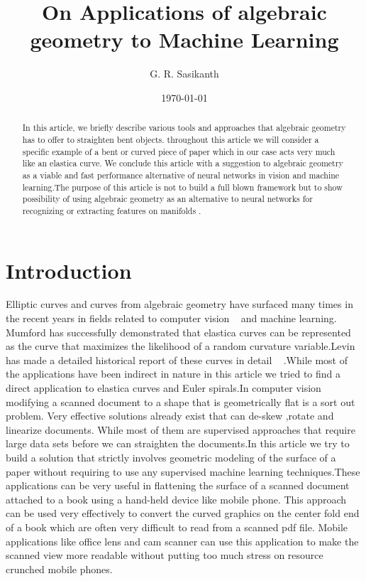 \documentclass[longbibliography]{revtex4-1}
\begin{document}
\title{On Applications of algebraic geometry to Machine Learning}
\author{G. R. Sasikanth}
\date{\today}
\begin{abstract}
 In this article, we briefly describe various tools and approaches that algebraic geometry has to offer to straighten bent objects.
 throughout this article we will consider a specific example of a bent or curved piece of paper which in our case acts very much like an     
 elastica curve. We conclude this article
 with a suggestion to algebraic geometry as a viable and fast performance alternative of neural networks in vision and
 machine learning.The purpose of this article is not to build a full blown framework but to show possibility of using 
 algebraic geometry as an alternative to neural networks for recognizing or extracting features on manifolds .
\end{abstract}
\maketitle

\section{Introduction}
Elliptic curves and curves from algebraic geometry have surfaced many times in the recent years in fields related to computer vision ~\cite{Mumford} and machine learning. Mumford has successfully demonstrated that elastica curves can be represented as the curve that maximizes the likelihood of a random curvature variable.Levin has made a detailed historical report of these curves in detail ~\cite{Levien} .While most of the applications have been indirect in nature in this article we tried to find a direct application to
elastica curves and Euler spirals.In computer vision modifying a scanned document to a shape that is geometrically flat is a sort out problem. Very effective solutions already exist that can de-skew ,rotate and linearize documents. While most of them are supervised approaches that require large data sets before we can straighten the documents.In this article we try to build a solution that strictly involves geometric modeling of the surface of a paper without requiring to use any supervised machine learning techniques.These applications can be very useful in flattening the surface of a scanned document attached to a book using a hand-held device like mobile phone. This approach can be used very effectively to convert the curved graphics on the center fold end of a book which are often very difficult to read from a scanned pdf file. Mobile applications like office lens and cam scanner can use this application to make the scanned view more readable without putting too much stress on resource crunched mobile phones.
\end{document}
